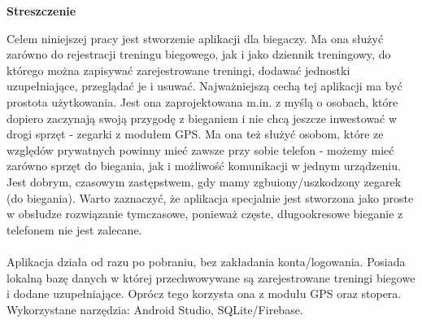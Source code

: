 \documentclass[a4paper,12pt,reqno]{article}
\begin{document}
\begin{flushleft}
	\Large \textbf{Streszczenie}
\end{flushleft}
\vspace{1cm}
Celem niniejszej pracy jest stworzenie aplikacji dla biegaczy. Ma ona służyć zarówno do rejestracji treningu biegowego, jak i jako dziennik treningowy, do którego można zapisywać zarejestrowane treningi, dodawać jednostki uzupełniające, przeglądać je i usuwać. Najważniejszą cechą tej aplikacji ma być prostota użytkowania. Jest ona zaprojektowana m.in. z myślą o osobach, które dopiero zaczynają swoją przygodę z bieganiem i nie chcą jeszcze inwestować w drogi sprzęt - zegarki z modułem GPS. Ma ona też służyć osobom, które ze względów prywatnych powinny mieć zawsze przy sobie telefon - możemy mieć zarówno sprzęt do biegania, jak i możliwość komunikacji w jednym urządzeniu. Jest dobrym, czasowym zastępstwem, gdy mamy zgbuiony/uszkodzony zegarek (do biegania). Warto zaznaczyć, że aplikacja specjalnie jest stworzona jako proste w obsłudze rozwiązanie tymczasowe, ponieważ częste, długookresowe bieganie z telefonem nie jest zalecane.\\ \\
Aplikacja działa od razu po pobraniu, bez zakładania konta/logowania. Posiada lokalną bazę danych w której przechwowywane są zarejestrowane treningi biegowe i dodane uzupełniające. Oprócz tego korzysta ona z modułu GPS oraz stopera. Wykorzystane narzędzia: Android Studio, SQLite/Firebase.
\end{document}
